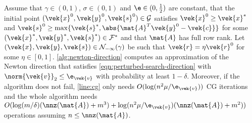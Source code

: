 \begin{theorem}\label{thm:approximate-newton-convergence}
  Assume that \(\gamma \in (0, 1)\), \(\sigma \in (0, 1)\) and \(\e \in (0, \frac{1}{2})\) are constant, that the initial point \((\vek{x}^0, \vek{y}^0, \vek{s}^0) \in \mathcal{G}\) satisfies \(\vek{x}^0 \geq \vek{x}^*\) and \(\vek{s}^0 \geq \max \{\vek{s}^*, \abs{\mat{A}^T \vek{y}^0 - \vek{c}}\}\) for some \((\vek{x}^*, \vek{y}^*, \vek{s}^*) \in \mathcal{F}^*\) and that \(\mat{A}\) has full row rank.
  Let \((\vek{x}, \vek{y}, \vek{s}) \in \mathcal{N}_{-\infty}(\gamma)\) be such that \(\vek{r} = \eta \vek{r}^0\) for some \(\eta \in [0, 1]\).
  \cref{alg:newton-direction} computes an approximation of the Newton direction that satisfies \cref{eqn:perturbed-search-direction} with \(\norm{\vek{v}}_2 \leq \e_{\vek{v}}\) with probability at least \(1 - \delta\).
  Moreover, if the algorithm does not fail, \cref{line:cg} only needs \(O(\log(n^2 \mu / \e_{\vek{v}}))\) CG iterations and the whole algorithm needs \(O(\log(m/\delta) (\nnz(\mat{A}) + m^3) + \log(n^2 \mu / \e_{\vek{v}})(\nnz(\mat{A}) + m^2))\) operations assuming \(n \leq \nnz(\mat{A})\).
\end{theorem}